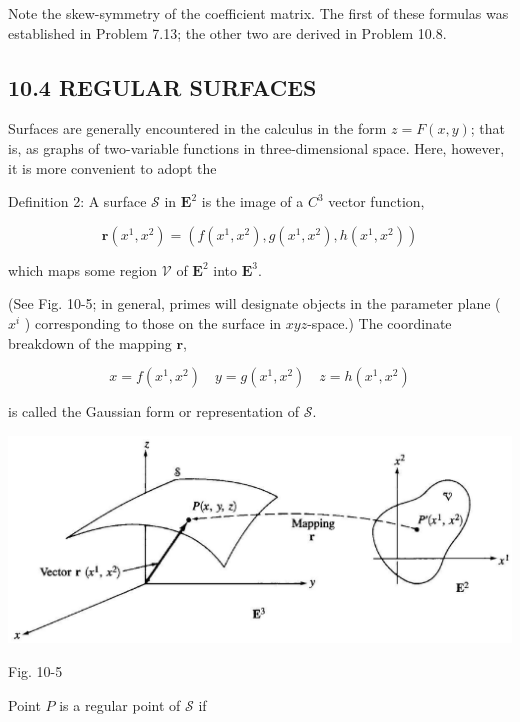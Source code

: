 \documentclass[10pt]{article}
\begin{document}
Note the skew-symmetry of the coefficient matrix. The first of these formulas was established in Problem 7.13; the other two are derived in Problem 10.8.

\subsection*{10.4 REGULAR SURFACES}
Surfaces are generally encountered in the calculus in the form $z=F(x, y)$; that is, as graphs of two-variable functions in three-dimensional space. Here, however, it is more convenient to adopt the

Definition 2: A surface $\mathscr{S}$ in $\mathbf{E}^{2}$ is the image of a $C^{3}$ vector function,

$$
\mathbf{r}\left(x^{1}, x^{2}\right)=\left(f\left(x^{1}, x^{2}\right), g\left(x^{1}, x^{2}\right), h\left(x^{1}, x^{2}\right)\right)
$$

which maps some region $\mathscr{V}$ of $\mathbf{E}^{2}$ into $\mathbf{E}^{3}$.

(See Fig. 10-5; in general, primes will designate objects in the parameter plane ( $x^{i}$ ) corresponding to those on the surface in $x y z$-space.) The coordinate breakdown of the mapping $\mathbf{r}$,


\begin{equation*}
x=f\left(x^{1}, x^{2}\right) \quad y=g\left(x^{1}, x^{2}\right) \quad z=h\left(x^{1}, x^{2}\right) \tag{10.10}
\end{equation*}


is called the Gaussian form or representation of $\mathscr{S}$.

\begin{center}
\includegraphics[max width=\textwidth]{2024_04_03_41f90be4f896e21f0dc9g-140}
\end{center}

Fig. 10-5

Point $P$ is a regular point of $\mathscr{S}$ if
\end{document}
